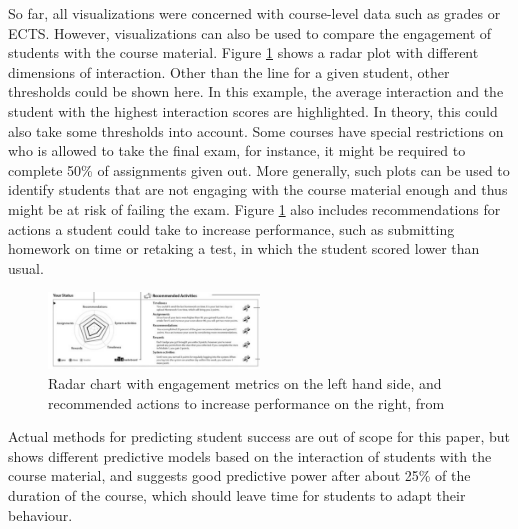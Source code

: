 So far, all visualizations were concerned with course-level data such as grades or ECTS. However, visualizations can also be used to compare the engagement of students with the course material. Figure \ref{fig:comp_engagement.png} shows a radar plot with different dimensions of interaction. Other than the line for a given student, other thresholds could be shown here. In this example, the average interaction and the student with the highest interaction scores are highlighted. In theory, this could also take some thresholds into account. Some courses have special restrictions on who is allowed to take the final exam, for instance, it might be required to complete 50\% of assignments given out.
More generally, such plots can be used to identify students that are not engaging with the course material enough and thus might be at risk of failing the exam. Figure \ref{fig:comp_engagement.png} also includes recommendations for actions a student could take to increase performance, such as submitting homework on time or retaking a test, in which the student scored lower than usual.

\begin{figure}
    \centering
    \includegraphics[width=0.5\textwidth]{figures/comp_engagement.png}
    \caption{Radar chart with engagement metrics on the left hand side, and recommended actions to increase performance on the right, from \cite{StudentFacingDashboard}}
    \label{fig:comp_engagement.png}
\end{figure}

Actual methods for predicting student success are out of scope for this paper, but \cite{DropoutPrediction-SelfRegulatedLearning} shows different predictive models based on the interaction of students with the course material, and suggests good predictive power after about 25\% of the duration of the course, which should leave time for students to adapt their behaviour.


